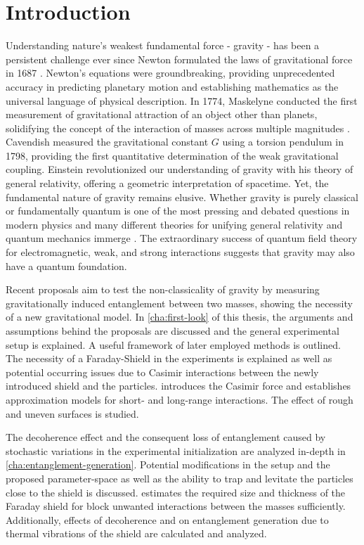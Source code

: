 \chapter{Introduction}\label{cha:introduction}

Understanding nature's weakest fundamental force - gravity - has been a persistent challenge ever since Newton formulated the laws of gravitational force in 1687 \cite{Newton_1687}.
Newton's equations were groundbreaking, providing unprecedented accuracy in predicting planetary motion and establishing mathematics as the universal language of physical description.
In 1774, Maskelyne conducted the first measurement of gravitational attraction of an object other than planets, solidifying the concept of the interaction of masses across multiple magnitudes \cite{Maskelyne_1775,Davies_1985}. 
Cavendish measured the gravitational constant $G$ using a torsion pendulum in 1798, providing the first quantitative determination of the weak gravitational coupling.
Einstein revolutionized our understanding of gravity with his theory of general relativity, offering a geometric interpretation of spacetime. Yet, the fundamental nature of gravity remains elusive. Whether gravity is purely classical or fundamentally quantum is one of the most pressing and debated questions in modern physics and many different theories for unifying general relativity and quantum mechanics immerge \cite{Becker_2007, Ashtekar_1986, Oppenheim_2023}.
The extraordinary success of quantum field theory for electromagnetic, weak, and strong interactions suggests that gravity may also have a quantum foundation.

Recent proposals \cite{Bose_2017,Marletto_2017} aim to test the non-classicality of gravity by measuring gravitationally induced entanglement between two masses, showing the necessity of a new gravitational model.
In \cref{cha:first-look} of this thesis, the arguments and assumptions behind the proposals are discussed and the general experimental setup is explained. A useful framework of later employed methods is outlined.
The necessity of a Faraday-Shield in the experiments is explained as well as potential occurring issues due to Casimir interactions \cite{Casimir_1948} between the newly introduced shield and the particles.
 introduces the Casimir force and establishes approximation models for short- and long-range interactions. The effect of rough and uneven surfaces is studied.

The decoherence effect and the consequent loss of entanglement caused by stochastic variations in the experimental initialization are analyzed in-depth in \cref{cha:entanglement-generation}. Potential modifications in the setup and the proposed parameter-space as well as the ability to trap and levitate the particles close to the shield is discussed. 
 estimates the required size and thickness of the Faraday shield for block unwanted interactions between the masses sufficiently. Additionally, effects of decoherence and on entanglement generation due to thermal vibrations of the shield are calculated and analyzed.